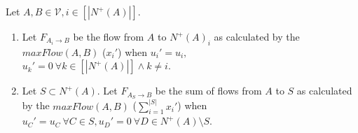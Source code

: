 \begin{definition}
   Let $A, B \in \mathcal{V}, i \in [|N^{+}(A)|]$. 
   \begin{enumerate} 
      \item Let $F_{A_i \rightarrow B}$ be the flow from $A$ to $N^{+}(A)_i$ as calculated by the $maxFlow(A,B)$ 
         ($x_i'$) when $u_i' = u_i,$ \\ $u_k' = 0 \:\forall k \in [|N^{+}(A)|] \wedge k \neq i$. 
      \item Let $S \subset N^{+}(A)$. Let $F_{A_S \rightarrow B}$ be the sum of flows from $A$ to $S$ as 
         calculated by the $maxFlow(A,B)$ ($\sum\limits_{i=1}^{|S|}x_i'$) when $u_C' = u_C \: \forall C \in S, 
         u_D' = 0 \: \forall D \in N^{+}(A) \setminus S$. 
   \end{enumerate} 
\end{definition} 
